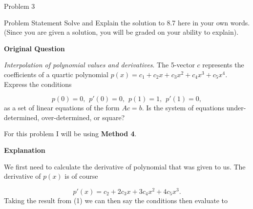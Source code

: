 \begin{problem}{Problem 3}
    \begin{statement}{Problem Statement}
        Solve and Explain the solution to 8.7 here in your own words. (Since you are given a solution, you will be graded on your ability to explain). \vspace*{1em}

        \noindent \textbf{Original Question} \vspace*{1em}

        \textit{Interpolation of polynomial values and derivatives}. The 5-vector $c$ represents the coefficients of a quartic polynomial $p(x) = c_{1} + c_{2}x + c_{3}x^{2} + c_{4}x^{3} + c_{5}x^{4}$. Express the conditions

        \begin{equation*}
            p(0) = 0, \hspace{5pt} p'(0) = 0, \hspace{5pt} p(1) = 1, \hspace{5pt} p'(1) = 0,
        \end{equation*}
        as a set of linear equations of the form $Ac = b$. Is the system of equations under-determined, over-determined, or square?
    \end{statement}

    \begin{highlight}[Solution]
        For this problem I will be using \textbf{Method 4}. \vspace*{1em}

        \noindent \textbf{Explanation} \vspace*{1em}

        We first need to calculate the derivative of polynomial that was given to us. The derivative of $p(x)$ is of course

        \setcounter{equation}{0}
        \begin{equation}
            p'(x) = c_{2} + 2c_{3}x + 3c_{4}x^{2} + 4c_{5}x^{3}.
        \end{equation}
        Taking the result from (1) we can then say the conditions then evaluate to


\end{highlight}
\end{problem}
